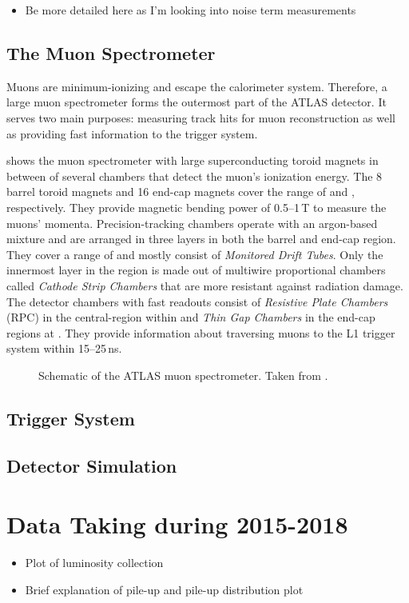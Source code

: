 \begin{itemize}
    \item Be more detailed here as I'm looking into noise term measurements
\end{itemize}

\subsection{The Muon Spectrometer}
Muons are minimum-ionizing and escape the calorimeter system. Therefore, a large muon spectrometer forms the outermost part of the ATLAS detector. It serves two main purposes: measuring track hits for muon reconstruction as well as providing fast information to the trigger system.

 shows the muon spectrometer with large superconducting toroid magnets in between of several chambers that detect the muon's ionization energy.
The 8 barrel toroid magnets and 16 end-cap magnets cover the range of  and , respectively. They provide magnetic bending power of \numrange{0.5}{1}\,T to measure the muons' momenta. Precision-tracking chambers operate with an argon-based mixture and are arranged in three layers in both the barrel and end-cap region. They cover a range of  and mostly consist of \emph{Monitored Drift Tubes}. Only the innermost layer in the region  is made out of multiwire proportional chambers called \emph{Cathode Strip Chambers} that are more resistant against radiation damage. The detector chambers with fast readouts consist of \emph{Resistive Plate Chambers} (RPC) in the central-region within  and \emph{Thin Gap Chambers} in the end-cap regions at . They provide information about traversing muons to the L1 trigger system within \numrange{15}{25}\,ns.



\begin{figure}
    \caption{Schematic of the ATLAS muon spectrometer. Taken from .}
    \label{fig:ATLASmuonspectrometer}
\end{figure}



\subsection{Trigger System}

\subsection{Detector Simulation}


\section{Data Taking during 2015-2018}
\label{sec:run-2-data-taking}
\begin{itemize}
    \item Plot of luminosity collection
    \item Brief explanation of pile-up and pile-up distribution plot
\end{itemize}

